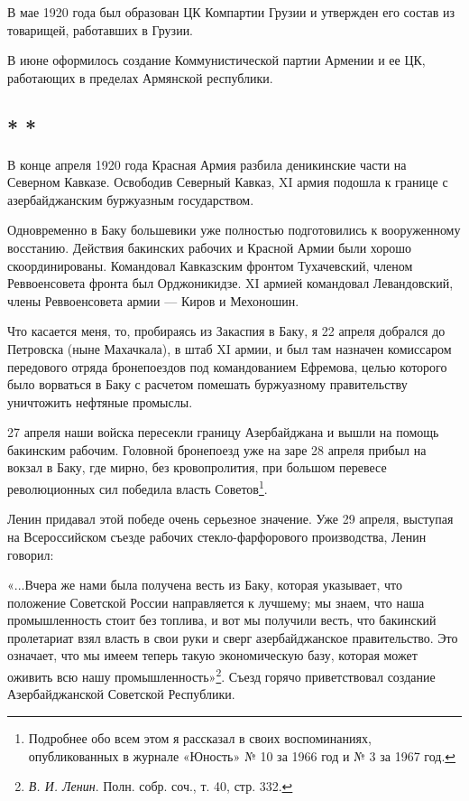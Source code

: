 \documentclass[12pt, a4paper, openany]{book}
\begin{document}
В мае 1920 года был образован ЦК Компартии Грузии и утвержден его состав из товарищей, работавших в Грузии.

В июне оформилось создание Коммунистической партии Армении и ее ЦК, работающих в пределах Армянской республики.

\subsection*{\center * * *}

В конце апреля 1920 года Красная Армия разбила деникинские части на Северном Кавказе. Освободив Северный Кавказ, XI армия подошла к границе с азербайджанским буржуазным государством.

Одновременно в Баку большевики уже полностью подготовились к вооруженному восстанию. Действия бакинских рабочих и Красной Армии были хорошо скоординированы. Командовал Кавказским фронтом Тухачевский, членом Реввоенсовета фронта был Орджоникидзе. XI армией командовал Левандовский, члены Реввоенсовета армии — Киров и Мехоношин.

Что касается меня, то, пробираясь из Закаспия в Баку, я 22 апреля добрался до Петровска (ныне Махачкала), в штаб XI армии, и был там назначен комиссаром передового отряда бронепоездов под командованием Ефремова, целью которого было ворваться в Баку с расчетом помешать буржуазному правительству уничтожить нефтяные промыслы.

27 апреля наши войска пересекли границу Азербайджана и вышли на помощь бакинским рабочим. Головной бронепоезд уже на заре 28 апреля прибыл на вокзал в Баку, где мирно, без кровопролития, при большом перевесе революционных сил победила власть Советов\footnote{Подробнее обо всем этом я рассказал в своих воспоминаниях, опубликованных в журнале «Юность» № 10 за 1966 год и № 3 за 1967 год.}.

Ленин придавал этой победе очень серьезное значение. Уже 29 апреля, выступая на Всероссийском съезде рабочих стекло-фарфорового производства, Ленин говорил:

«...Вчера же нами была получена весть из Баку, которая указывает, что положение Советской России направляется к лучшему; мы знаем, что наша промышленность стоит без топлива, и вот мы получили весть, что бакинский пролетариат взял власть в свои руки и сверг азербайджанское правительство. Это означает, что мы имеем теперь такую экономическую базу, которая может оживить всю нашу промышленность»\footnote{\textit{В. И. Ленин}. Полн. собр. соч., т. 40, стр. 332.}. Съезд горячо приветствовал создание Азербайджанской Советской Республики.
\end{document}
